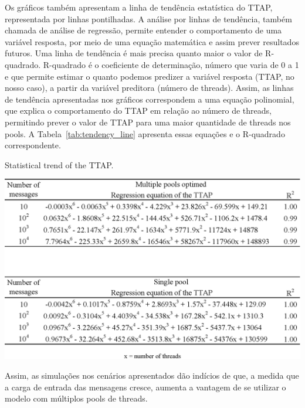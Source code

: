 Os gráficos também apresentam a linha de tendência estatística do TTAP, representada por linhas pontilhadas. A análise por linhas de tendência, também chamada de análise de regressão, permite entender o comportamento de uma variável resposta, por meio de uma equação matemática e assim prever resultados futuros. Uma linha de tendência é mais precisa quanto maior o valor de R-quadrado. R-quadrado é o coeficiente de determinação, número que varia de 0 a 1 e que permite estimar o quanto podemos predizer a variável resposta (TTAP, no nosso caso), a partir da variável preditora (número de threads). Assim, as linhas de tendência apresentadas nos gráficos correspondem a uma equação polinomial, que explica o comportamento do TTAP em relação ao número de threads, permitindo prever o valor de TTAP para uma maior quantidade de threads nos pools. A Tabela~\ref{tab:tendency_line} apresenta essas equações e o R-quadrado correspondente.
%
\begin{table}[htb]
\centering
\caption{Statistical trend of the TTAP.}
\label{tab:tendency_line}
\includegraphics[width=0.7\linewidth]{./figs/equation.eps}
\end{table}  
%
Assim, as simulações nos cenários apresentados dão indícios de que, a medida que a carga de entrada das mensagens cresce, aumenta a vantagem de se utilizar o modelo com múltiplos pools de threads.

